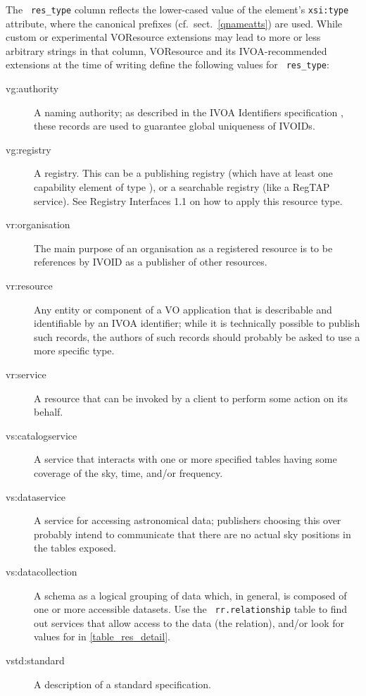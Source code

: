 \documentclass[11pt,a4paper]{ivoa}
\newcommand{\rtent}[1]{\texttt{\color{rtcolor} #1}}
\begin{document}
The \rtent{res\_type} column reflects the lower-cased value of
the  element's \texttt{xsi:type} attribute,
where the canonical prefixes (cf.~sect.~\ref{qnameatts}) 
are used.  While custom or experimental
VOResource extensions may lead to more or less arbitrary strings in that
column, VOResource and its IVOA-recommended extensions at the time of
writing define the following values for \rtent{res\_type}:


\begin{description}
\item[vg:authority]A naming authority; as described in the IVOA
Identifiers specification \citep{2016ivoa.spec.0523D}, these records 
are used to guarantee global uniqueness of IVOIDs.
\item[vg:registry]A registry.  This can be a publishing registry (which
have at least one capability element of type ), or a
searchable registry (like a RegTAP service).  See Registry Interfaces
1.1 on how to apply this resource type.
\item[vr:organisation]The main purpose of an organisation as a registered resource is to
be references by IVOID as a publisher of other resources.
\item[vr:resource]Any entity or component of a VO application that is describable and
identifiable by an IVOA identifier; while it is technically possible to
publish such records, the authors of such records should probably be
asked to use a more specific type.
\item[vr:service]A resource that can be invoked by a client to perform some action on
its behalf.
\item[vs:catalogservice]A service that interacts with one or more specified tables having
some coverage of the sky, time, and/or frequency.
\item[vs:dataservice]A service for accessing astronomical data; publishers choosing
this over  probably intend to communicate
that there are no actual sky positions in the tables exposed.
\item[vs:datacollection]A schema as a logical grouping of data which, in general, is
composed of one or more accessible datasets.  Use the
\rtent{rr.relationship} table to find out services that allow
access to the data (the  relation), and/or look for values for
 in
\ref{table_res_detail}.
\item[vstd:standard]A description of a standard specification.

\end{description}
\end{document}
